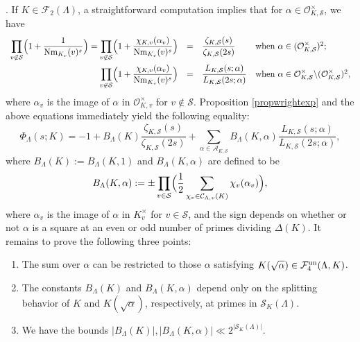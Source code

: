 \documentclass[10pt]{article}
\theoremstyle{plain}
\theoremstyle{definition}
\theoremstyle{remark}
\def\un{{\rm un}}
\def\cC{{\mathcal C}}
\def\cF{{\mathcal F}}
\def\cO{{\mathcal O}}
\def\cS{{\mathcal S}}
\newcommand{\cA}{{\mathcal A}}
\DeclareMathOperator{\Nm}{Nm}
\begin{document}
\medskip

.
If $K \in \cF_2(\Lambda)$, a straightforward computation implies that for
$\alpha\in\cO_{K,\cS}^\times$, we have
\begin{equation*}
\begin{array}{rcll}
\displaystyle\prod_{v\not\in \cS}
\Bigl(1+\frac{1}{\Nm_{K_v}(v)^s}\Bigr) = \displaystyle\prod_{v\not\in \cS}
\Bigl(1+\frac{\chi_{K,v}(\alpha_v)}{\Nm_{K_v}(v)^s}\Bigr)&=&
\displaystyle\frac{\zeta_{K,\cS}(s)}{\zeta_{K,\cS}(2s)}&
\mbox{when }\alpha\in(\cO_{K,\cS}^\times)^2;\\[.2in]
\displaystyle\prod_{v\not\in \cS}
\Bigl(1+\frac{\chi_{K,v}(\alpha_v)}{\Nm_{K_v}(v)^s}\Bigr)&=&
\displaystyle\frac{L_{K,\cS}(s;\alpha)}{L_{K,\cS}(2s;\alpha)}&
\mbox{when }\alpha\in\cO_{K,\cS}^\times\backslash(\cO_{K,\cS}^\times)^2,
\end{array}
\end{equation*}
where $\alpha_v$ is the image of $\alpha$ in  $\cO_{K,v}^\times$ for $v \notin \cS$.
Proposition \ref{propwrightexp} and the above equations immediately
yield the following equality:
\begin{equation}\label{eqsec2mtalmost}
  \Phi_{\Lambda}(s;K)=
 -1+B_\Lambda(K)
  \frac{\zeta_{K,\cS}(s)}{\zeta_{K,\cS}(2s)} +
  \sum_{\alpha\in\cA_{K,\cS}}B_\Lambda(K,\alpha)
  \frac{L_{K,\cS}(s;\alpha)}{L_{K,\cS}(2s;\alpha)},
\end{equation}
where $B_\Lambda(K):=B_\Lambda(K,1)$ and $B_\Lambda(K,\alpha)$ are
defined to be
\begin{equation}\label{eqdefBLK}
  B_{\Lambda}(K,\alpha):=\pm\prod_{v\in\cS}
  \Bigl(\frac12\sum_{\chi_v\in\cC_{\Lambda,v}(K)}\chi_v(\alpha_v)
  \Bigr),
\end{equation}
where $\alpha_v$ is the image of $\alpha$ in $K_v^\times$ for $v \in \cS$, and the sign depends on whether or not $\alpha$ is a square at an
even or odd number of primes dividing $\Delta(K)$. It remains to
prove the following three points:
\begin{enumerate}
\item The sum over $\alpha$ can be restricted to those $\alpha$
  satisfying $K(\sqrt{\alpha}) \in \cF^{\un}_4(\Lambda,K)$.
\item The constants $B_{\Lambda}(K)$ and $B_{\Lambda}(K,\alpha)$
  depend only on the splitting behavior of $K$ and $K(\sqrt{\alpha})$,
  respectively, at primes in $\cS_K(\Lambda)$.
\item We have the bounds $|B_{\Lambda}(K)|,|B_{\Lambda}(K,\alpha)|\ll
  2^{|\cS_K(\Lambda)|}$.
\end{enumerate}
\end{document}
